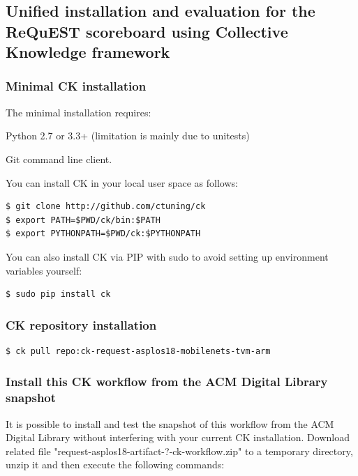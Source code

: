 \documentclass[sigconf]{acmart}
\newenvironment{packed_itemize}{
\begin{itemize}
  \setlength{\itemsep}{1pt}
  \setlength{\parskip}{0pt}
  \setlength{\parsep}{0pt}
}{\end{itemize}}
\begin{document}
\subsection{Unified installation and evaluation for the ReQuEST scoreboard using Collective Knowledge framework}

\subsubsection{Minimal CK installation}

The minimal installation requires:

\begin{packed_itemize}
 \item Python 2.7 or 3.3+ (limitation is mainly due to unitests)
 \item Git command line client.
\end{packed_itemize}

You can install CK in your local user space as follows:

\begin{verbatim}
$ git clone http://github.com/ctuning/ck
$ export PATH=$PWD/ck/bin:$PATH
$ export PYTHONPATH=$PWD/ck:$PYTHONPATH
\end{verbatim}

You can also install CK via PIP with sudo to avoid setting up environment variables yourself:

\begin{verbatim}
$ sudo pip install ck
\end{verbatim}

\subsubsection{CK repository installation}

\begin{verbatim}
$ ck pull repo:ck-request-asplos18-mobilenets-tvm-arm
\end{verbatim}

\subsubsection{Install this CK workflow from the ACM Digital Library snapshot}

It is possible to install and test the snapshot of this workflow 
from the ACM Digital Library without interfering with your current CK installation.
Download related file "request-asplos18-artifact-?-ck-workflow.zip"
to a temporary directory, unzip it and then execute the following commands:
\end{document}
